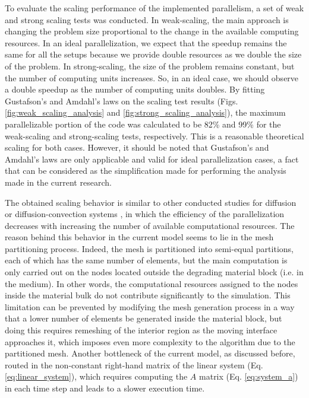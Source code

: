 To evaluate the scaling performance of the implemented parallelism, a set of weak and strong scaling tests was conducted. In weak-scaling, the main approach is changing the problem size proportional to the change in the available computing resources. In an ideal parallelization, we expect that the speedup remains the same for all the setups because we provide double resources as we double the size of the problem. In strong-scaling, the size of the problem remains constant, but the number of computing units increases. So, in an ideal case, we should observe a double speedup as the number of computing units doubles.
By fitting Gustafson's and Amdahl's laws on the scaling test results (Figs. \ref{fig:weak_scaling_analysis} and \ref{fig:strong_scaling_analysis}), the maximum parallelizable portion of the code was calculated to be 82\% and 99\% for the weak-scaling and strong-scaling tests, respectively. This is a reasonable theoretical scaling for both cases. However, it should be noted that  Gustafson's and Amdahl's laws are only applicable and valid for ideal parallelization cases, a fact that can be considered as the simplification made for performing the analysis made in the current research.

The obtained scaling behavior is similar to other conducted  studies for diffusion or diffusion-convection systems \cite{Hassan2011,Rettinger2017}, in which the efficiency of the parallelization decreases with increasing the number of available computational resources. The reason behind this behavior in the current model seems to lie in the mesh partitioning process. Indeed, the mesh is partitioned into semi-equal partitions, each of which has the same number of elements, but the main computation is only carried out on the nodes located outside the degrading material block (i.e. in the medium). In other words, the computational resources assigned to the nodes inside the material bulk do not contribute significantly to the simulation. This limitation can be prevented by modifying the mesh generation process in a way that a lower number of elements be generated inside the material block, but doing this requires remeshing of the interior region as the moving interface approaches it, which imposes even more complexity to the algorithm due to the partitioned mesh. Another bottleneck of the current model, as discussed before, routed in the non-constant right-hand matrix of the linear system (Eq. \ref{eq:linear_system}), which requires computing the $A$ matrix (Eq. \ref{eq:system_a}) in each time step and leads to a slower execution time.

